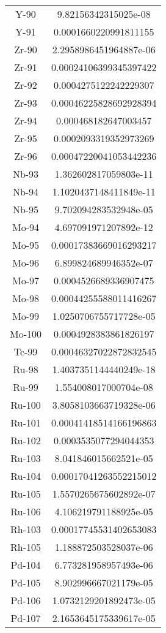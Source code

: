 \begin{table}[h!]
\begin{tabular}{|| c || c |}
Y-90 &  9.82156342315025e-08 \\
Y-91 &  0.0001660220991811155 \\
Zr-90 &  2.2958986451964887e-06 \\
Zr-91 &  0.00024106399345397422 \\
Zr-92 &  0.0004275122242229307 \\
Zr-93 &  0.00046225828692928394 \\
Zr-94 &  0.000468182647003457 \\
Zr-95 &  0.0002093319352973269 \\
Zr-96 &  0.00047220041053442236 \\
Nb-93 &  1.362602817059803e-11 \\
Nb-94 &  1.1020437148411849e-11 \\
Nb-95 &  9.702094283532948e-05 \\
Mo-94 &  4.697091971207892e-12 \\
Mo-95 &  0.00017383669016293217 \\
Mo-96 &  6.899824689946352e-07 \\
Mo-97 &  0.0004526689336907475 \\
Mo-98 &  0.00044255588011416267 \\
Mo-99 &  1.0250706755717728e-05 \\
Mo-100 &  0.0004928383861826197 \\
Tc-99 &  0.00046327022872832545 \\
Ru-98 &  1.4037351144440249e-18 \\
Ru-99 &  1.554008017000704e-08 \\
Ru-100 &  3.8058103663719328e-06 \\
Ru-101 &  0.00041418514166196863 \\
Ru-102 &  0.0003535077294044353 \\
Ru-103 &  8.041846015662521e-05 \\
Ru-104 &  0.00017041263552215012 \\
Ru-105 &  1.5570265675602892e-07 \\
Ru-106 &  4.106219791188925e-05 \\
Rh-103 &  0.00017745531402653083 \\
Rh-105 &  1.188872503528037e-06 \\
Pd-104 &  6.773281958957493e-06 \\
Pd-105 &  8.902996667021179e-05 \\
Pd-106 &  1.0732129201892473e-05 \\
Pd-107 &  2.1653645175339617e-05 \\

\end{tabular}
\end{table}
